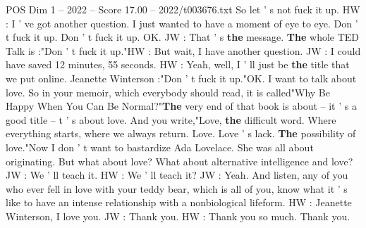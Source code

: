 \begin{textsample}{POS Dim 1 – 2022 – Score 17.00 – 2022/t003676.txt}
So let ' s not fuck it up.
HW : I ' ve got another question.
I just wanted to have a moment of eye to eye.
Don ' t fuck it up.
Don ' t fuck it up.
OK.
JW : That ' s \textbf{the} message. \textbf{The} whole TED Talk is :"Don ' t fuck it up."HW : But wait, I have another question.
JW : I could have saved 12 minutes, 55 seconds.
HW : Yeah, well, I ' ll just be \textbf{the} title that we put online.
Jeanette Winterson :"Don ' t fuck it up."OK.
I want to talk about love.
So in your memoir, which everybody should read, it is called"Why Be Happy When You Can Be Normal?"\textbf{The} very end of that book is about -- it ' s a good title -- t ' s about love.
And you write,"Love, \textbf{the} difficult word.
Where everything starts, where we always return.
Love.
Love ' s lack. \textbf{The} possibility of love."Now I don ' t want to bastardize Ada Lovelace.
She was all about originating.
But what about love?
What about alternative intelligence and love?
JW : We ' ll teach it.
HW : We ' ll teach it?
JW : Yeah.
And listen, any of you who ever fell in love with your teddy bear, which is all of you, know what it ' s like to have an intense relationship with a nonbiological lifeform.
HW : Jeanette Winterson, I love you.
JW : Thank you.
HW : Thank you so much.
Thank you.

\end{textsample}
